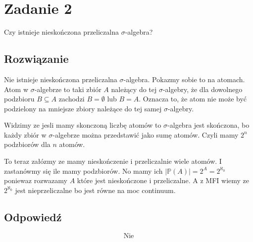 \section{Zadanie 2}
Czy istnieje nieskończona przeliczalna \(\sigma\)-algebra?

\subsection*{Rozwiązanie}
Nie istnieje nieskończona przeliczalna \(\sigma\)-algebra. Pokazmy sobie to na atomach.
Atom w \(\sigma\)-algebrze to taki zbiór \(A\) należący do tej \(\sigma\)-algebry, że dla dowolnego podzbioru \(B \subseteq A\) zachodzi \(B = \emptyset\) lub \(B = A\). Oznacza to, że atom nie może być podzielony na mniejsze zbiory należące do tej samej \(\sigma\)-algebry.

Widzimy ze jesli mamy skonczoną liczbę atomów to \(\sigma\)-algebra jest skończona, bo każdy zbiór w \(\sigma\)-algebrze można przedstawić jako sumę atomów. Czyli mamy \(2^n\) podzbiorów dla \(n\) atomów.

To teraz załózmy ze mamy nieskończenie i przeliczalnie wiele atomów. I zastanówmy się ile mamy podzbiorów.
No mamy ich \(|\mathbb{P}(A)| = 2^A = 2^{\aleph_0}\) poniewaz rozwazamy \(A\) które jest nieskończone i przeliczalne.
A z MFI wiemy ze \(2^{\aleph_0}\) jest nieprzeliczalne bo jest równe na moc continuum.

\subsection*{Odpowiedź}
\[
	\boxed{\text{Nie}}
\]
